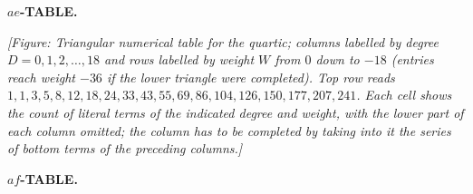 \documentclass[11pt]{article}
\begin{document}
\medskip
{}

\bigskip
\begin{center}\textbf{$ae$-TABLE.}\end{center}

\medskip
\noindent\textit{[Figure: Triangular numerical table for the quartic; columns labelled by degree $D = 0, 1, 2, \ldots, 18$ and rows labelled by weight $W$ from $0$ down to $-18$ (entries reach weight $-36$ if the lower triangle were completed). Top row reads $1, 1, 3, 5, 8, 12, 18, 24, 33, 43, 55, 69, 86, 104, 126, 150, 177, 207, 241$. Each cell shows the count of literal terms of the indicated degree and weight, with the lower part of each column omitted; the column has to be completed by taking into it the series of bottom terms of the preceding columns.]}

\bigskip
\begin{center}\textbf{$af$-TABLE.}\end{center}
\end{document}
